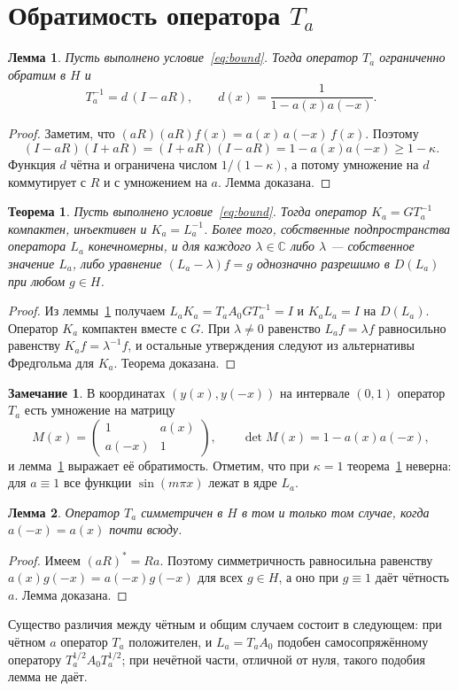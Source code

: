 \documentclass[12pt,a4paper]{article}
\newtheorem{theorem}{Теорема}
\newtheorem{lemma}{Лемма}
\theoremstyle{definition}
\newtheorem{remark}{Замечание}
\renewcommand{\C}{\mathbb C}
\begin{document}
\section{Обратимость оператора $T_a$}
\begin{lemma}\label{lem:inverse}
Пусть выполнено условие~\eqref{eq:bound}. Тогда оператор $T_a$ ограниченно обратим в $H$ и
\[
 T_a^{-1}=d\,(I-aR),\qquad d(x)=\frac1{1-a(x)a(-x)}.
\]
\end{lemma}
\begin{proof}
Заметим, что $(aR)(aR)f(x)=a(x)\,a(-x)\,f(x)$. Поэтому
\[
 (I-aR)(I+aR)=(I+aR)(I-aR)=1-a(x)a(-x)\ge1-\kappa .
\]
Функция $d$ чётна и ограничена числом $1/(1-\kappa)$, а потому умножение на $d$
коммутирует с $R$ и с умножением на $a$. Лемма доказана.
\end{proof}

\begin{theorem}\label{th:class}
Пусть выполнено условие~\eqref{eq:bound}. Тогда оператор $K_a=GT_a^{-1}$ компактен,
инъективен и $K_a=L_a^{-1}$. Более того, собственные подпространства оператора $L_a$
конечномерны, и для каждого $\lambda\in\C$ либо $\lambda$ --- собственное значение $L_a$,
либо уравнение $(L_a-\lambda)f=g$ однозначно разрешимо в $D(L_a)$ при любом $g\in H$.
\end{theorem}
\begin{proof}
Из леммы~\ref{lem:inverse} получаем $L_aK_a=T_aA_0GT_a^{-1}=I$ и $K_aL_a=I$ на
$D(L_a)$. Оператор $K_a$ компактен вместе с $G$. При $\lambda\ne0$ равенство
$L_af=\lambda f$ равносильно равенству $K_af=\lambda^{-1}f$, и остальные утверждения
следуют из альтернативы Фредгольма для $K_a$. Теорема доказана.
\end{proof}

\begin{remark}\label{rem:matrix}
В координатах $(y(x),y(-x))$ на интервале $(0,1)$ оператор $T_a$ есть умножение на
матрицу
\[
 M(x)=\begin{pmatrix}1&a(x)\\a(-x)&1\end{pmatrix},\qquad\det M(x)=1-a(x)a(-x),
\]
и лемма~\ref{lem:inverse} выражает её обратимость. Отметим, что при $\kappa=1$
теорема~\ref{th:class} неверна: для $a\equiv1$ все функции $\sin(m\pi x)$ лежат в ядре
$L_a$.
\end{remark}

\begin{lemma}\label{lem:sym}
Оператор $T_a$ симметричен в $H$ в том и только том случае, когда $a(-x)=a(x)$ почти
всюду.
\end{lemma}
\begin{proof}
Имеем $(aR)^*=Ra$. Поэтому симметричность равносильна равенству
$a(x)g(-x)=a(-x)g(-x)$ для всех $g\in H$, а оно при $g\equiv1$ даёт чётность $a$.
Лемма доказана.
\end{proof}
Существо различия между чётным и общим случаем состоит в следующем: при чётном $a$
оператор $T_a$ положителен, и $L_a=T_aA_0$ подобен самосопряжённому оператору
$T_a^{1/2}A_0T_a^{1/2}$; при нечётной части, отличной от нуля, такого подобия лемма не
даёт.
\end{document}

